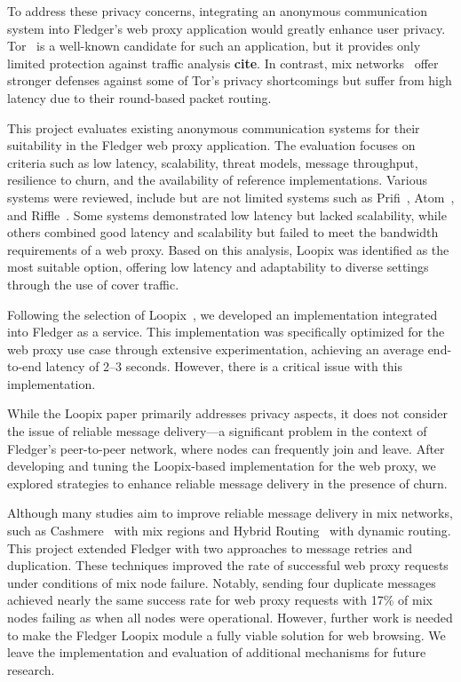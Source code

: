 \documentclass[a4paper,11pt,oneside]{report}
\begin{document}
To address these privacy concerns, integrating an anonymous communication system into Fledger's web proxy application would greatly enhance user privacy. Tor~\cite{tor} is a well-known candidate for such an application, but it provides only limited protection against traffic analysis \textbf{cite}. In contrast, mix networks~\cite{chaum1981mix} offer stronger defenses against some of Tor's privacy shortcomings but suffer from high latency due to their round-based packet routing.

This project evaluates existing anonymous communication systems for their suitability in the Fledger web proxy application. The evaluation focuses on criteria such as low latency, scalability, threat models, message throughput, resilience to churn, and the availability of reference implementations. Various systems were reviewed, include but are not limited systems such as Prifi~\cite{prifi}, Atom~\cite{atom}, and Riffle~\cite{Riffle}. Some systems demonstrated low latency but lacked scalability, while others combined good latency and scalability but failed to meet the bandwidth requirements of a web proxy. Based on this analysis, Loopix was identified as the most suitable option, offering low latency and adaptability to diverse settings through the use of cover traffic.

Following the selection of Loopix~\cite{loopix}, we developed an implementation integrated into Fledger as a service. This implementation was specifically optimized for the web proxy use case through extensive experimentation, achieving an average end-to-end latency of 2–3 seconds. However, there is a critical issue with this implementation.

While the Loopix paper primarily addresses privacy aspects, it does not consider the issue of reliable message delivery—a significant problem in the context of Fledger’s peer-to-peer network, where nodes can frequently join and leave. After developing and tuning the Loopix-based implementation for the web proxy, we explored strategies to enhance reliable message delivery in the presence of churn.

Although many studies aim to improve reliable message delivery in mix networks, such as Cashmere~\cite{cashmere} with mix regions and Hybrid Routing~\cite{hybrid_routing} with dynamic routing. This project extended Fledger with two approaches to  message retries and duplication. These techniques improved the rate of successful web proxy requests under conditions of mix node failure. Notably, sending four duplicate messages achieved nearly the same success rate for web proxy requests with 17\% of mix nodes failing as when all nodes were operational. However, further work is needed to make the Fledger Loopix module a fully viable solution for web browsing. We leave the implementation and evaluation of additional mechanisms for future research.
\end{document}

